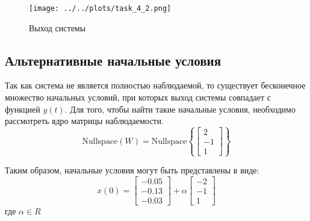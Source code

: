 \begin{figure}[H]
    \centering
    \texttt{[image: ../../plots/task\_4\_2.png]}
    \caption{Выход системы}
    \label{fig:task4_output}
\end{figure}

\subsection{Альтернативные начальные условия} 
Так как система не является полностью наблюдаемой, то существует бесконечное множество начальных условий,
при которых выход системы совпадает с функцией $y(t)$. Для того, чтобы найти такие начальные условия, необходимо
рассмотреть ядро матрицы наблюдаемости.
\begin{equation}
    \text{Nullspace}(W) =  \text{Nullspace}\left\{\begin{bmatrix}
        2 \\ -1 \\ 1
    \end{bmatrix}  \right\}
\end{equation}

Таким образом, начальные условия могут быть представлены в виде: 
\begin{equation}
    x(0) = \begin{bmatrix}
        -0.05 \\ -0.13 \\ -0.03
    \end{bmatrix} + \alpha \begin{bmatrix}
        -2 \\ -1 \\ 1
    \end{bmatrix}
\end{equation}
где $\alpha \in R$

